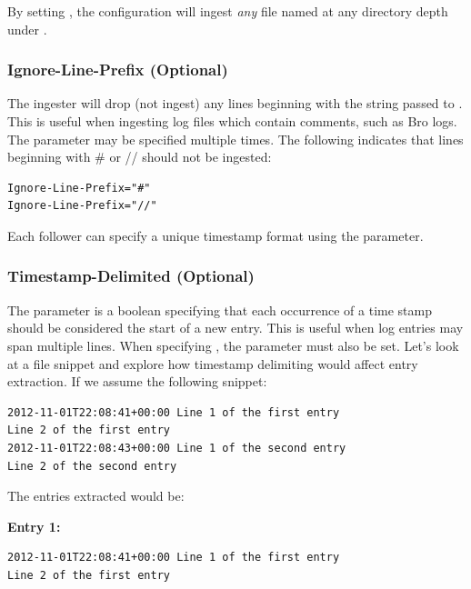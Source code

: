 By setting , the configuration will ingest
\emph{any} file named  at any directory depth under
.

\subsubsection{Ignore-Line-Prefix (Optional)}

The ingester will drop (not ingest) any lines beginning with the string
passed to . This is useful when ingesting log
files which contain comments, such as Bro logs. The
 parameter may be specified multiple times. The
following indicates that lines beginning with \# or // should not be
ingested:

\begin{Verbatim}[breaklines=true]
Ignore-Line-Prefix="#"
Ignore-Line-Prefix="//"
\end{Verbatim}

Each follower can specify a unique timestamp format using the
 parameter.

\subsubsection{Timestamp-Delimited (Optional)}

The  parameter is a boolean specifying that each
occurrence of a time stamp should be considered the start of a new
entry. This is useful when log entries may span multiple lines. When
specifying , the
 parameter must also be set. Let's look at
a file snippet and explore how timestamp delimiting would affect entry
extraction. If we assume the following snippet:

\begin{Verbatim}[breaklines=true]
2012-11-01T22:08:41+00:00 Line 1 of the first entry
Line 2 of the first entry
2012-11-01T22:08:43+00:00 Line 1 of the second entry
Line 2 of the second entry
\end{Verbatim}

The entries extracted would be:

\textbf{Entry 1:}

\begin{Verbatim}[breaklines=true]
2012-11-01T22:08:41+00:00 Line 1 of the first entry
Line 2 of the first entry
\end{Verbatim}

